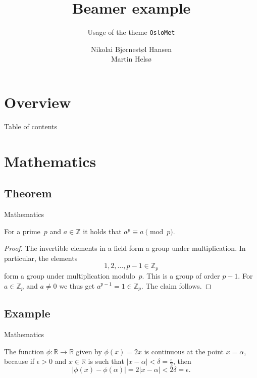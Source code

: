 \documentclass[UKenglish]{beamer}
\author[Hansen \& Helsø]
{Nikolai Bjørnestøl Hansen \texorpdfstring{\\}{} Martin Helsø}
\title{Beamer example}
\subtitle{Usage of the theme \texttt{OsloMet}}
\begin{document}
\section{Overview}
%
%
\begin{frame}{Table of contents}
    \tableofcontents
\end{frame}

\section{Mathematics}
\subsection{Theorem}


\hidelogo

\begin{frame}{Mathematics}

    \begin{theorem}
        For a prime~\(p\) and \(a \in \mathbb{Z}\) it holds that \(a^p \equiv a \pmod{p}\).
    \end{theorem}

    \begin{proof}
        The invertible elements in a field form a group under multiplication.
        In particular, the elements
        \begin{equation*}
            1, 2, \ldots, p - 1 \in \mathbb{Z}_p
        \end{equation*}
        form a group under multiplication modulo~\(p\).
        This is a group of order \(p - 1\).
        For \(a \in \mathbb{Z}_p\) and \(a \neq 0\) we thus get \(a^{p-1} = 1 \in \mathbb{Z}_p\).
        The claim follows.
    \end{proof}
\end{frame}

\showlogo

\subsection{Example}

\begin{frame}{Mathematics}

    \begin{example}
        The function \(\phi \colon \mathbb{R} \to \mathbb{R}\) given by \(\phi(x) = 2x\) is continuous at the point \(x = \alpha\),
        because if \(\epsilon > 0\) and \(x \in \mathbb{R}\) is such that \(\lvert x - \alpha \rvert < \delta = \frac{\epsilon}{2}\),
        then
        \begin{equation*}
            \lvert \phi(x) - \phi(\alpha)\rvert = 2\lvert x - \alpha \rvert < 2\delta = \epsilon.
        \end{equation*}
    \end{example}
\end{frame}
\end{document}
